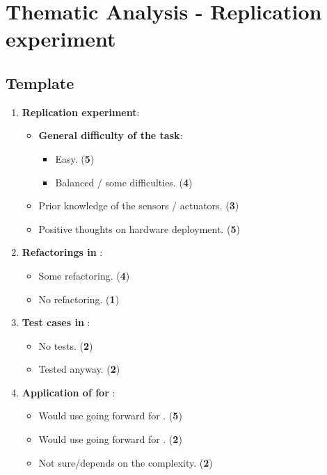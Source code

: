 \chapter{Thematic Analysis - Replication experiment}
\label{appendix:E_Thematic_Analysis_Replication}
\section{Template}
\begin{enumerate}
    \item \textbf{Replication experiment}:
    \begin{itemize}
        \item \textbf{General difficulty of the task}:
        \begin{itemize}
            \item Easy. (\textbf{5})
            \item Balanced / some difficulties. (\textbf{4})
        \end{itemize}
        \item Prior knowledge of the sensors / actuators. (\textbf{3})
        \item Positive thoughts on hardware deployment. (\textbf{5})
    \end{itemize}

    \item \textbf{Refactorings in \tdd}:
    \begin{itemize}
        \item Some refactoring. (\textbf{4})
        \item No refactoring. (\textbf{1})
    \end{itemize}

    \item \textbf{Test cases in \notdd}:
    \begin{itemize}
        \item No tests. (\textbf{2})
        \item Tested anyway. (\textbf{2})
    \end{itemize}

    \item \textbf{Application of \tdd for \ess}:
    \begin{itemize}
        \item Would use \tdd going forward for \ess. (\textbf{5})
        \item Would use \notdd going forward for \ess. (\textbf{2})
        \item Not sure/depends on the complexity. (\textbf{2})
    \end{itemize}


\end{enumerate}
